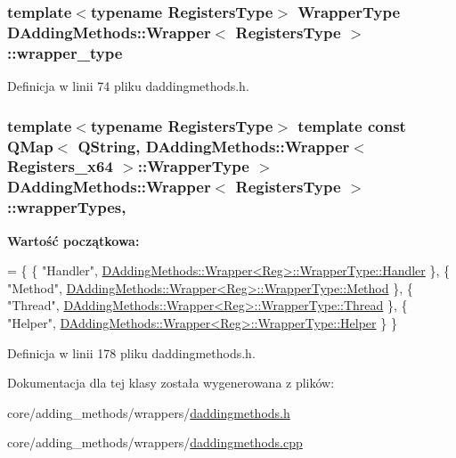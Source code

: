 \hypertarget{class_d_adding_methods_1_1_wrapper_aaa1e1c8e0902c6241c714498dc9e5316}{
\subsubsection[{wrapper\-\_\-type}]{\setlength{\rightskip}{0pt plus 5cm}template$<$typename Registers\-Type$>$ {\bf Wrapper\-Type} {\bf D\-Adding\-Methods\-::\-Wrapper}$<$ Registers\-Type $>$\-::wrapper\-\_\-type}}\label{class_d_adding_methods_1_1_wrapper_aaa1e1c8e0902c6241c714498dc9e5316}


Definicja w linii 74 pliku daddingmethods.\-h.

\hypertarget{class_d_adding_methods_1_1_wrapper_abcab95b43aa54857c51d47c8cb283f7b}{
\subsubsection[{wrapper\-Types}]{\setlength{\rightskip}{0pt plus 5cm}template$<$typename Registers\-Type$>$ template const Q\-Map$<$ Q\-String, {\bf D\-Adding\-Methods\-::\-Wrapper}$<$ {\bf Registers\-\_\-x64} $>$\-::{\bf Wrapper\-Type} $>$ {\bf D\-Adding\-Methods\-::\-Wrapper}$<$ Registers\-Type $>$\-::wrapper\-Types\hspace{0.3cm}{\ttfamily [static]}, {\ttfamily [private]}}}\label{class_d_adding_methods_1_1_wrapper_abcab95b43aa54857c51d47c8cb283f7b}
{\bfseries Wartość początkowa\-:}
\begin{DoxyCode}
=
\{
    \{ \textcolor{stringliteral}{"Handler"}, \hyperlink{class_d_adding_methods_1_1_wrapper}{DAddingMethods::Wrapper<Reg>::WrapperType::Handler}
       \},
    \{ \textcolor{stringliteral}{"Method"}, \hyperlink{class_d_adding_methods_1_1_wrapper}{DAddingMethods::Wrapper<Reg>::WrapperType::Method}
       \},
    \{ \textcolor{stringliteral}{"Thread"}, \hyperlink{class_d_adding_methods_1_1_wrapper}{DAddingMethods::Wrapper<Reg>::WrapperType::Thread}
       \},
    \{ \textcolor{stringliteral}{"Helper"}, \hyperlink{class_d_adding_methods_1_1_wrapper}{DAddingMethods::Wrapper<Reg>::WrapperType::Helper}
       \}
\}
\end{DoxyCode}


Definicja w linii 178 pliku daddingmethods.\-h.



Dokumentacja dla tej klasy została wygenerowana z plików\-:\begin{DoxyCompactItemize}
\item 
core/adding\-\_\-methods/wrappers/\hyperlink{daddingmethods_8h}{daddingmethods.\-h}\item 
core/adding\-\_\-methods/wrappers/\hyperlink{daddingmethods_8cpp}{daddingmethods.\-cpp}\end{DoxyCompactItemize}
